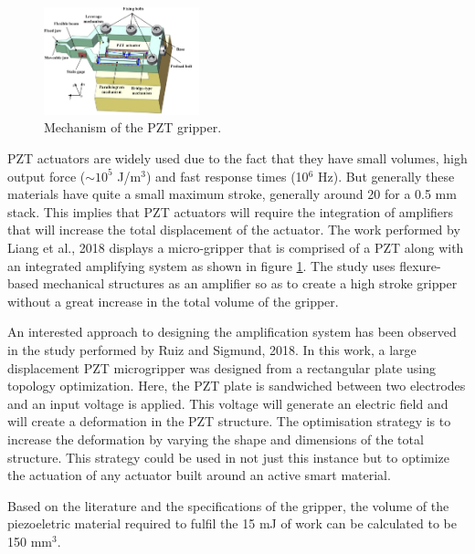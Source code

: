 \begin{figure}
	\centering
	\vspace{-10pt}
	\includegraphics[width=0.40\textwidth]{Figures/PZT_grip.png}
	\caption{Mechanism of the PZT gripper\cite{liang_design_2018}.}
	\vspace{-10pt}
	\label{fig:PZT_grip}
\end{figure}

PZT actuators are widely used due to the fact that they have small volumes, high output force ($\sim10^5$ J/m$^3$) and fast response times (10$^6$ Hz)\cite{faran_ferromagnetic_2016}. But generally these materials have quite a small maximum stroke, generally around 20 \micrometer for a 0.5 mm stack\cite{rupitsch_piezoelectric_2019}. This implies that PZT actuators will require the integration of amplifiers that will increase the total displacement of the actuator. The work performed by Liang et al., 2018\cite{liang_design_2018} displays a micro-gripper that is comprised of a PZT along with an integrated amplifying system as shown in figure \ref{fig:PZT_grip}. The study uses flexure-based mechanical structures as an amplifier so as to create a high stroke gripper without a great increase in the total volume of the gripper.

An interested approach to designing the amplification system has been observed in the study performed by Ruiz and Sigmund, 2018\cite{ruiz_optimal_2018}. In this work, a large displacement PZT microgripper was designed from a rectangular plate using topology optimization. Here, the PZT plate is sandwiched between two electrodes and an input voltage is applied. This voltage will generate an electric field and will create a deformation in the PZT structure. The optimisation strategy is to increase the deformation by varying the shape and dimensions of the total structure. This strategy could be used in not just this instance but to optimize the actuation of any actuator built around an active smart material.

Based on the literature and the specifications of the gripper, the volume of the piezoeletric material required to fulfil the 15 mJ of work can be calculated to be 150 mm$^3$.

